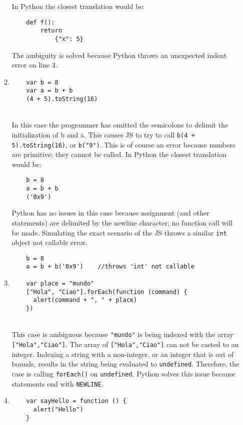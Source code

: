 \documentclass{article}
\begin{document}
\begin{enumerate}
\begin{enumerate}
    In Python the closest translation would be:
    \begin{verbatim}
    def f():
        return
            {"x": 5}    
    \end{verbatim}
    The ambiguity is solved because Python throws an unexpected indent error on line 3. \\
    \item 
    \begin{verbatim}
    var b = 8
    var a = b + b
    (4 + 5).toString(16)
    \end{verbatim} \\
    In this case the programmer has omitted the semicolons to delimit the initialization of b and a. This causes JS to try to call \texttt{b(4 + 5).toString(16)}, or \texttt{b("9")}. This is of course an error because numbers are primitive; they cannot be called.
    In Python the closest translation would be:
    \begin{verbatim}
    b = 8
    a = b + b
    ('0x9')
    \end{verbatim}
    Python has no issues in this case because assignment (and other statements) are delimited by the newline character; no function call will be made. Simulating the exact scenario of the JS throws a similar \texttt{int} object not callable error.
    \begin{verbatim}
    b = 8
    a = b + b('0x9')    //throws 'int' not callable
    \end{verbatim}
    \item 
    \begin{verbatim}
    var place = "mundo"
    ["Hola", "Ciao"].forEach(function (command) {
      alert(command + ", " + place)
    })
    \end{verbatim} \\
    This case is ambiguous because \texttt{"mundo"} is being indexed with the array \texttt{["Hola","Ciao"]}. The array of \texttt{["Hola","Ciao"]} can not be casted to an integer. Indexing a string with a non-integer, or an integer that is out of bounds, results in the string being evaluated to \texttt{undefined}. Therefore, the case is calling \texttt{forEach()} on \texttt{undefined}. Python solves this issue because statements end with \texttt{NEWLINE}. \\
    \item
    \begin{verbatim}
    var sayHello = function () {
      alert("Hello")
    }


\end{verbatim}
\end{enumerate}
\end{enumerate}
\end{document}
